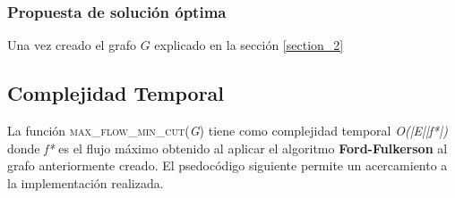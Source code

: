 \documentclass[10pt]{article} %
\begin{document}
	\subsubsection{Propuesta de soluci\'on \'optima}
	
	Una vez creado el grafo $G$ explicado en la secci\'on \ref{section_2}
	
	

	
	
	
	
	

	
	
	
	
	
	
	\subsection{Complejidad Temporal}
	
	La funci\'on \textsc{max\_flow\_min\_cut(\textit{G})} tiene como complejidad temporal \textit{O(|E||f*|)} donde \textit{f*} es el flujo m\'aximo obtenido al aplicar el algoritmo \textbf{Ford-Fulkerson} al grafo anteriormente creado. El psedoc\'odigo siguiente permite un acercamiento a la implementaci\'on realizada.
	
\end{document}
